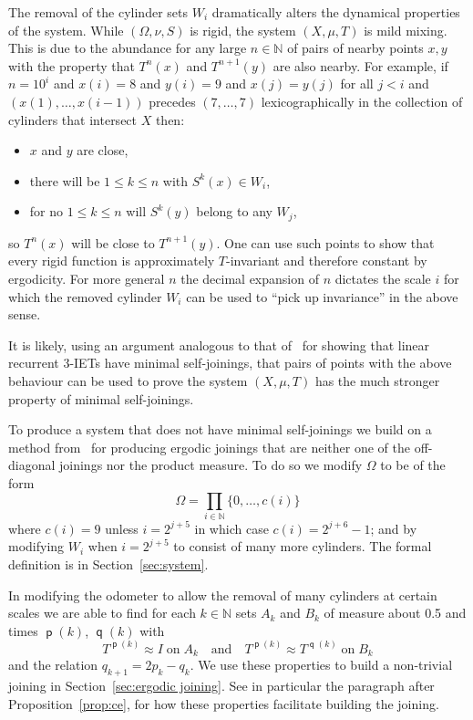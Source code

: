 \documentclass[10pt]{amsart}
\theoremstyle{definition}\newtheorem{defi}[theo]{Definition}\newtheorem{rema}[theo]{Remark}\newtheorem{exam}[theo]{Example}\newtheorem{exem}[theo]{Example}\newtheorem{nota}[theo]{Notation}
\DeclareMathOperator{\p}{\mathsf{p}}
\DeclareMathOperator{\q}{\mathsf{q}}
\newcommand{\N}{\mathbb{N}}
\begin{document}
The removal of the cylinder sets $W_i$ dramatically alters the dynamical properties of the system. While $(\Omega,\nu,S)$ is rigid, the system $(X,\mu,T)$ is mild mixing. This is due to the abundance for any large $n \in \N$ of pairs of nearby points $x,y$ with the property that $T^n(x)$ and $T^{n+1}(y)$ are also nearby. For example, if $n = 10^i$ and $x(i) = 8$ and $y(i) = 9$ and $x(j) = y(j)$ for all $j < i$ and $(x(1),\dots,x(i-1))$ precedes $(7,\dots,7)$ lexicographically in the collection of cylinders that intersect $X$ then:
\begin{itemize}
\item $x$ and $y$ are close,
\item there will be $1 \le k \le n$ with $S^k(x) \in W_i$,
\item for no $1 \le k \le n$ will $S^k(y)$ belong to any $W_j$,
\end{itemize}
so $T^n(x)$ will be close to $T^{n+1}(y)$. One can use such points to show that every rigid function is approximately $T$-invariant and therefore constant by ergodicity. For more general $n$ the decimal expansion of $n$ dictates the scale $i$ for which the removed cylinder $W_i$ can be used to ``pick up invariance'' in the above sense.

It is likely, using an argument analogous to that of~\cite{MR2129107} for showing that linear recurrent 3-IETs have minimal self-joinings, that pairs of points with the above behaviour can be used to prove the system $(X,\mu,T)$ has the much stronger property of minimal self-joinings.

To produce a system that does not have minimal self-joinings we build on a method from~\cite{MR4269425} for producing ergodic joinings that are neither one of the off-diagonal joinings nor the product measure. To do so we modify $\Omega$ to be of the form
\[
\Omega = \prod_{i \in \N} \{ 0,\dots,c(i) \}
\]
where $c(i) = 9$ unless $i = 2^{j+5}$ in which case $c(i) = 2^{j+6} - 1$; and by modifying $W_i$ when $i = 2^{j+5}$ to consist of many more cylinders. The formal definition is in Section~\ref{sec:system}.

In modifying the odometer to allow the removal of many cylinders at certain scales we are able to find for each $k \in \N$ sets $A_k$ and $B_k$ of measure about 0.5 and times $\p(k)$, $\q(k)$ with
\begin{equation}\label{intro:reduction}
T^{\p(k)} \approx I \;\text{on}\; A_k
\quad\text{and}\quad T^{\p(k)} \approx T^{\q(k)} \;\text{on}\; B_k
\end{equation}
and the relation $q_{k+1} = 2p_k - q_k$. We use these properties to build a non-trivial joining in Section~\ref{sec:ergodic joining}. See in particular the paragraph after Proposition~\ref{prop:ce}, for how these properties facilitate building the joining.
\end{document}
